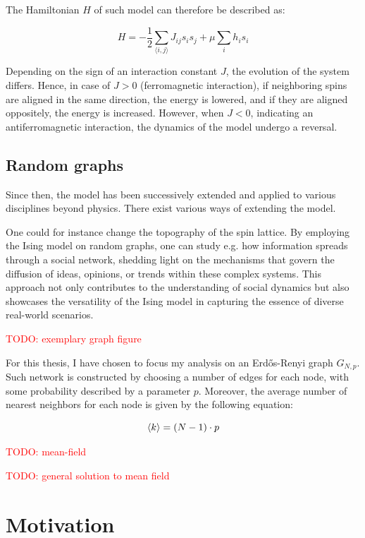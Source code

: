 \documentclass[11pt,a4paper]{article}
\newcommand{\todo}[1]{\textcolor{red}{TODO: #1}}
\begin{document}
The Hamiltonian $H$ of such model can therefore be described as:

\begin{equation}
    H = -\frac12\sum_{\langle i,j \rangle} J_{ij} s_i s_j + \mu\sum_i h_i s_i
\end{equation}

Depending on the sign of an interaction constant $J$, the evolution of the system differs. Hence, in case of $J>0$ (ferromagnetic interaction), if neighboring spins are aligned in the same direction, the energy is lowered, and if they are aligned oppositely, the energy is increased. However, when $J<0$, indicating  an antiferromagnetic interaction, the dynamics of the model undergo a reversal.


\subsection{Random graphs}

Since then, the model has been successively extended and applied to various disciplines beyond physics. There exist various ways of extending the model.

One could for instance change the topography of the spin lattice. By employing the Ising model on random graphs, one can study e.g. how information spreads through a social network, shedding light on the mechanisms that govern the diffusion of ideas, opinions, or trends within these complex systems. This approach not only contributes to the understanding of social dynamics but also showcases the versatility of the Ising model in capturing the essence of diverse real-world scenarios.

\todo{exemplary graph figure}

For this thesis, I have chosen to focus my analysis on an Erdős-Renyi graph $G_{N,p}$. Such network is constructed by choosing a number of edges for each node, with some probability described by a parameter $p$. Moreover, the average number of nearest neighbors for each node is given by the following equation:

\begin{equation}
    \braket{k} = (N-1) \cdot p
\end{equation}

\todo{mean-field}

\todo{general solution to mean field}

\section{Motivation}
\end{document}
